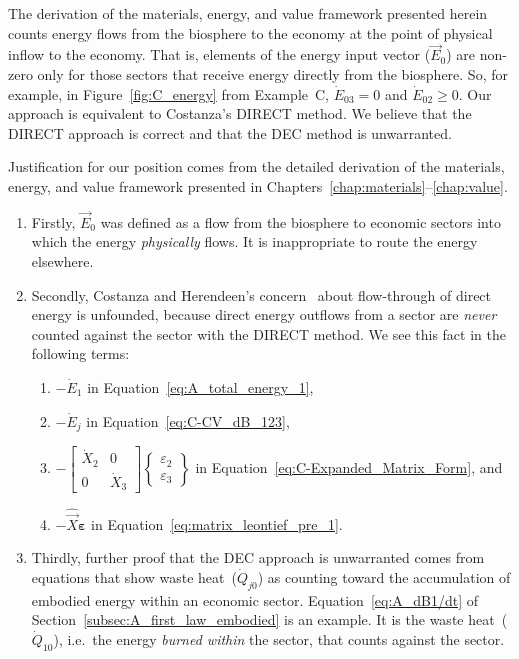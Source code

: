 The derivation of the materials, energy, and value framework
presented herein counts energy flows from the biosphere to the economy
at the point of physical inflow to the economy. 
That is, elements of the energy input vector 
($\vec{E}_{0}$) are non-zero only for those sectors 
that receive energy directly from the biosphere. 
So, for example, in Figure~\ref{fig:C_energy} from Example~C, 
$\dot{E}_{03} = 0$ and $\dot{E}_{02} \ge 0$. 
Our approach is equivalent to Costanza's DIRECT method.
We believe that the DIRECT approach is correct and that the DEC method is unwarranted.

Justification for our position comes from the detailed derivation
of the materials, energy, and value framework presented in 
Chapters~\ref{chap:materials}--\ref{chap:value}. 

\begin{enumerate}
	\item 
		Firstly, $\vec{E}_{0}$ was defined as a flow 
		from the biosphere to economic sectors
		into which the energy \emph{physically} flows.
		It is inappropriate to route the energy elsewhere.
	\item 
		Secondly, Costanza and Herendeen's 
		concern~\cite[pp. 130 \& 138]{Costanza:1984tq}
		about flow-through of direct energy is unfounded, 
		because direct energy outflows from a sector
		are \emph{never} counted against the sector
		with the DIRECT method.
		We see this fact in the following terms:
			\begin{enumerate}
				\item
					{$- \dot{E}_{1}$ in 
					Equation~\ref{eq:A_total_energy_1},}
				\item
					{$- \dot{E}_{j}$ in Equation~\ref{eq:C-CV_dB_123},}
				\item
					{$- 
						\begin{bmatrix}
							\dot{X}_{2} & 0          \\
							0           & \dot{X}_{3}
						\end{bmatrix}
						\begin{Bmatrix}
							\varepsilon_{2}\\
							\varepsilon_{3}
						\end{Bmatrix}
					$
					in Equation~\ref{eq:C-Expanded_Matrix_Form}, and}
				\item
					{$- \hat{\vec{X}}\bm{\varepsilon}$ 
					in Equation~\ref{eq:matrix_leontief_pre_1}.}
			\end{enumerate}
	\item
		Thirdly, further proof that the DEC approach is unwarranted
		comes from equations that show waste 
		heat~($\dot{Q}_{j0}$) as counting toward 
		the accumulation of embodied energy within 
		an economic sector.
		Equation~\ref{eq:A_dB1/dt} of 
		Section~\ref{subsec:A_first_law_embodied}
		is an example. 
		It is the waste heat~($\dot{Q}_{10}$), 
		i.e.\ the energy \emph{burned within} the sector,
		that counts against the sector.
\end{enumerate}
